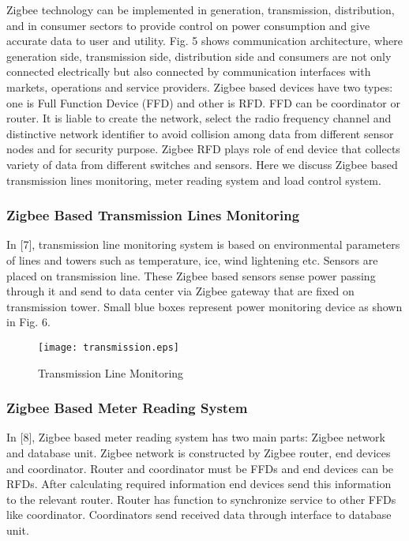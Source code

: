 \documentclass[10pt, conference, compsocconf]{IEEEtran}
\begin{document}
Zigbee technology can be implemented in generation, transmission, distribution, and in consumer sectors to provide control on power consumption and give accurate data to user and utility. Fig. 5 shows communication architecture, where generation side, transmission side, distribution side and consumers are not only connected electrically but also connected by communication interfaces with markets, operations and service providers. Zigbee based devices have two types: one is Full Function Device (FFD) and other is RFD. FFD can be coordinator or router. It is liable to create the network, select the radio frequency channel and distinctive network identifier to avoid collision among data from different sensor nodes and for security purpose. Zigbee RFD plays role of end device that collects variety of data from different switches and sensors. Here we discuss Zigbee based transmission lines monitoring, meter reading system and load control system.


\subsubsection{Zigbee Based Transmission Lines Monitoring}

In [7], transmission line monitoring system is based on environmental parameters of lines and towers such as temperature, ice, wind lightening etc. Sensors are placed on transmission line. These Zigbee based sensors sense power passing through it and send to data center via Zigbee gateway that are fixed on transmission tower. Small blue boxes represent power monitoring device as shown in Fig. 6.

\begin{figure*}[t]
\centering
  \texttt{[image: transmission.eps]}\\
  \caption{Transmission Line Monitoring}
\end{figure*}

\subsubsection{Zigbee Based Meter Reading System}

In [8], Zigbee based meter reading system has two main parts: Zigbee network and database unit. Zigbee network is constructed by Zigbee router, end devices and coordinator. Router and coordinator must be FFDs and end devices can be RFDs. After calculating required information end devices send this information to the relevant router. Router has function to synchronize service to other FFDs like coordinator. Coordinators send received data through  interface to database unit.
\end{document}
